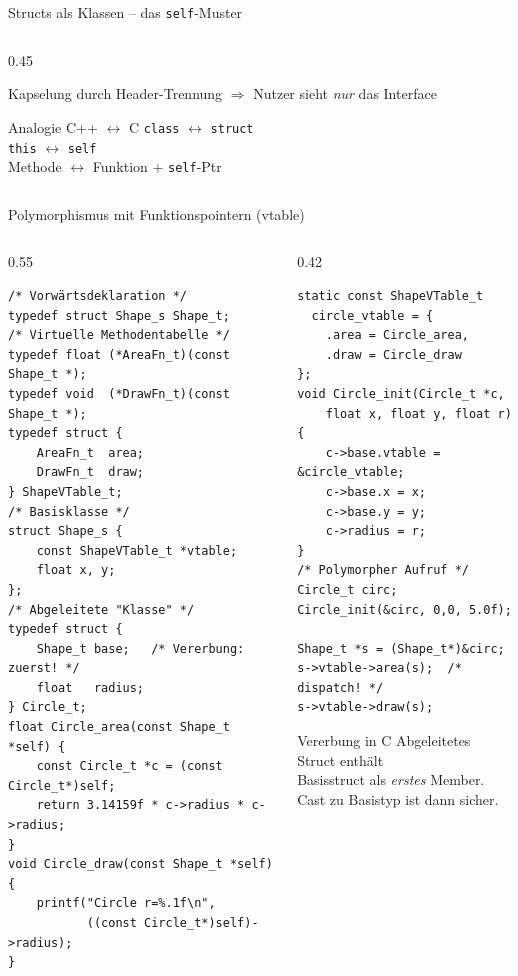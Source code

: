 \documentclass[%
  aspectratio=169,
  10pt
]{beamer}
\begin{document}
\begin{frame}[fragile]{Structs als Klassen -- das \texttt{self}-Muster}
\begin{columns}[T]
\begin{column}{0.45\textwidth}
\begin{block}{Kapselung durch Header-Trennung}
        $\Rightarrow$ Nutzer sieht \emph{nur} das Interface
      \end{block}
      \begin{exampleblock}{Analogie C++ $\leftrightarrow$ C}
        \texttt{class} $\leftrightarrow$ \texttt{struct}\\
        \texttt{this} $\leftrightarrow$ \texttt{self}\\
        Methode $\leftrightarrow$ Funktion + \texttt{self}-Ptr
      \end{exampleblock}
    \end{column}
  \end{columns}
\end{frame}

\begin{frame}[fragile]{Polymorphismus mit Funktionspointern (vtable)}
  \begin{columns}[T]
    \begin{column}{0.55\textwidth}
\begin{lstlisting}
/* Vorwärtsdeklaration */
typedef struct Shape_s Shape_t;
/* Virtuelle Methodentabelle */
typedef float (*AreaFn_t)(const Shape_t *);
typedef void  (*DrawFn_t)(const Shape_t *);
typedef struct {
    AreaFn_t  area;
    DrawFn_t  draw;
} ShapeVTable_t;
/* Basisklasse */
struct Shape_s {
    const ShapeVTable_t *vtable;
    float x, y;
};
/* Abgeleitete "Klasse" */
typedef struct {
    Shape_t base;   /* Vererbung: zuerst! */
    float   radius;
} Circle_t;
float Circle_area(const Shape_t *self) {
    const Circle_t *c = (const Circle_t*)self;
    return 3.14159f * c->radius * c->radius;
}
void Circle_draw(const Shape_t *self) {
    printf("Circle r=%.1f\n",
           ((const Circle_t*)self)->radius);
}
\end{lstlisting}
    \end{column}
    \begin{column}{0.42\textwidth}
\begin{lstlisting}
static const ShapeVTable_t
  circle_vtable = {
    .area = Circle_area,
    .draw = Circle_draw
};
void Circle_init(Circle_t *c,
    float x, float y, float r) {
    c->base.vtable = &circle_vtable;
    c->base.x = x;
    c->base.y = y;
    c->radius = r;
}
/* Polymorpher Aufruf */
Circle_t circ;
Circle_init(&circ, 0,0, 5.0f);

Shape_t *s = (Shape_t*)&circ;
s->vtable->area(s);  /* dispatch! */
s->vtable->draw(s);
\end{lstlisting}
      \begin{block}{Vererbung in C}
        Abgeleitetes Struct enthält\\
        Basisstruct als \emph{erstes} Member.\\
        Cast zu Basistyp ist dann sicher.
      \end{block}
    \end{column}
  \end{columns}
\end{frame}
\end{document}

